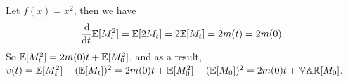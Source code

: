 \begin{enumerate}
        Let $f(x) = x^2$, then we have 
        \begin{equation*}
            \frac{\dif}{\dif t}\mbb{E}[M_t^2] = \mbb{E} [2 M_t] = 2 \mbb{E} [M_t] = 2m(t) = 2m(0).
        \end{equation*}
        So $\mathbb{E}[M_t^2] = 2m(0) t + \mathbb{E}[M_0^2]$, and as a result, $v(t) = \mathbb{E}[M_t^2] - (\mathbb{E} [M_t])^2 = 2m(0) t + \mathbb{E}[M_0^2] - (\mathbb{E} [M_0])^2 = 2m(0) t +  \mathbb{VAR} [M_0]$.
\end{enumerate}

